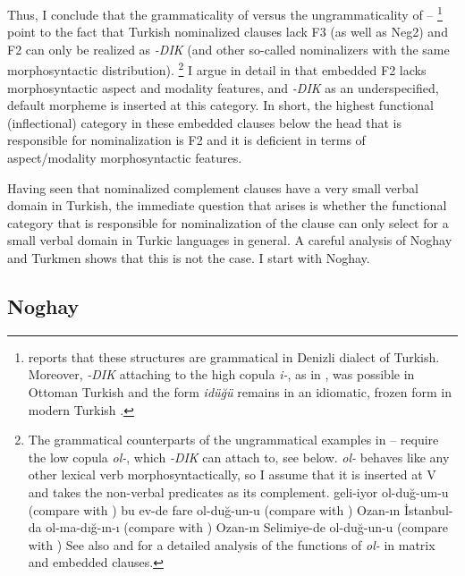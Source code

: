 \documentclass[output=paper]{langsci/langscibook}
\begin{document}
Thus, I conclude that the grammaticality of  versus the ungrammaticality of --%
\footnote{
    \citet{Sag2013} reports that these structures are grammatical in Denizli dialect of Turkish. 
    Moreover, \textit{-DIK} attaching to the high copula \textit{i-}, as in , 
    was possible in Ottoman Turkish \citep[195]{Kerslake1988} 
    and the form \textit{idüğü} remains in an idiomatic, frozen form in modern Turkish \citep{Banguoglu1990,Kelepir2013}.
} 
point to the fact that Turkish nominalized clauses lack F3 (as well as Neg2) and F2 can only be realized as \textit{-DIK} 
(and other so-called nominalizers with the same morphosyntactic distribution).%
\footnote{
    The grammatical counterparts of the ungrammatical examples in -- require the low copula \textit{ol-}, 
    which \textit{-DIK} can attach to, see  below. 
    \textit{ol-} behaves like any other lexical verb morphosyntactically, so I assume that it is inserted at V 
    and takes the non-verbal predicates as its complement.
    \ea
        \label{kelepirex:key:i:ftn11}
        \ea geli-iyor ol-duğ-um-u (compare with )  
        \ex bu ev-de fare ol-duğ-un-u (compare with )
        \ex Ozan-ın İstanbul-da ol-ma-dığ-ın-ı (compare with )
        \ex Ozan-ın Selimiye-de ol-duğ-un-u (compare with )
        \z 
    \z 
    See also \citet{Kerslake1988} and \citet{Goksel2001} for a detailed analysis of the functions of \textit{ol-} in matrix and embedded clauses.
} 
I argue in detail in \citet{Kelepir2013} that embedded F2 lacks morphosyntactic aspect and modality features, 
and \textit{-DIK} as an underspecified, default morpheme is inserted at this category. 
In short, the highest functional (inflectional) category in these embedded clauses below the head 
that is responsible for nominalization is F2 and it is deficient in terms of aspect/modality morphosyntactic features.

Having seen that nominalized complement clauses have a very small verbal domain in Turkish, 
the immediate question that arises is whether the functional category that is responsible for nominalization of the clause 
can only select for a small verbal domain in Turkic languages in general. 
A careful analysis of Noghay and Turkmen shows that this is not the case. 
I start with Noghay.

\subsection{Noghay} 
\label{kelepirsec:key:2.3}
\end{document}
